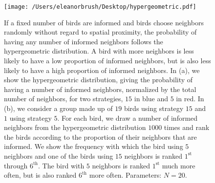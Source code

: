 \documentclass{article}
\begin{document}
\begin{figure}
\texttt{[image: /Users/eleanorbrush/Desktop/hypergeometric.pdf]}
\caption{\label{hypergeo} If a fixed number of birds are informed and birds choose neighbors randomly without regard to spatial proximity, the probability of having any number of informed neighbors follows the hypergeometric distribution. A bird with more neighbors is less likely to have a low proportion of informed neighbors, but is also less likely to have a high proportion of informed neighbors. In (a), we show the hypergeometric distribution, giving the probability of having a number of informed neighbors, normalized by the total number of neighbors, for two strategies, $15$ in blue and $5$ in red. In (b), we consider a group made up of $19$ birds using strategy $15$ and $1$ using strategy $5$. For each bird, we draw a number of informed neighbors from the hypergeometric distribution  $1000$ times and rank the birds according to the proportion of their neighbors that are informed. We show the frequency with which the bird using $5$ neighbors and one of the birds using $15$ neighbors is ranked $1^\text{st}$ through $6^\text{th}$. The bird with $5$ neighbors is ranked $1^\text{st}$ much more often, but is also ranked $6^\text{th}$ more often. Parameters: $N=20$. }
\end{figure}






\end{document}

